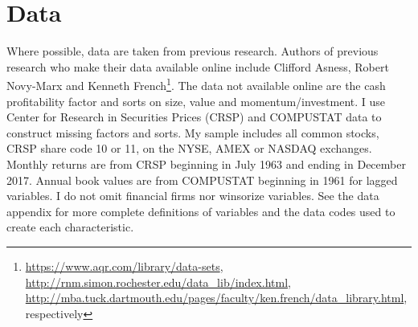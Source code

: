 
\section{Data}

Where possible, data are taken from previous research. Authors of previous research who
make their data available online include Clifford Asness, Robert Novy-Marx  and Kenneth
French\footnote{
\url{https://www.aqr.com/library/data-sets},
\url{http://rnm.simon.rochester.edu/data_lib/index.html},
\url{http://mba.tuck.dartmouth.edu/pages/faculty/ken.french/data_library.html},
respectively}.
The data not available online are the cash profitability factor and sorts on size, value
and momentum/investment. I use Center for Research in Securities Prices (CRSP) and
COMPUSTAT data to construct missing factors and sorts. My sample includes all common
stocks, CRSP share code 10 or 11, on the NYSE, AMEX or NASDAQ exchanges. Monthly returns
are from CRSP beginning in July 1963 and ending in December 2017. Annual book values are
from COMPUSTAT beginning in 1961 for lagged variables. I do not omit financial firms nor
winsorize variables. See the data appendix for more complete definitions of variables and
the data codes used to create each characteristic.

